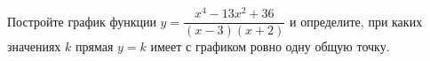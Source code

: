 \begin{ex}
	Постройте график функции $y=\dfrac{x^4-13x^2+36}{(x-3)(x+2)}$ и определите, при каких значениях $k$ прямая $y=k$ имеет с графиком ровно одну общую точку.
\end{ex}